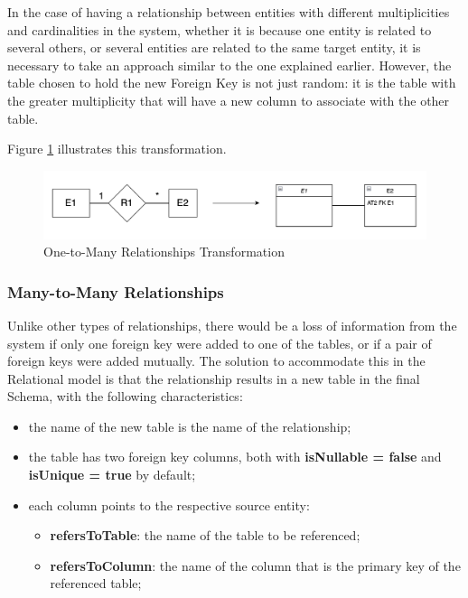 \documentclass[10pt]{article}
\begin{document}
In the case of having a relationship between entities with different multiplicities and cardinalities in the system, whether it is because one entity is related to several others, or several entities are related to the same target entity, it is necessary to take an approach similar to the one explained earlier. However, the table chosen to hold the new Foreign Key is not just random: it is the table with the greater multiplicity that will have a new column to associate with the other table.

Figure \ref{figure7} illustrates this transformation.

\begin{center}
    \begin{figure}[H]
        \centering
        \includegraphics[width=1.0\textwidth]{imgs/one-to-many-transformation.png}
            \caption{One-to-Many Relationships Transformation}
        \label{figure7}
    \end{figure}
\end{center}

\subsubsection{Many-to-Many Relationships}

Unlike other types of relationships, there would be a loss of information from the system if only one foreign key were added to one of the tables, or if a pair of foreign keys were added mutually. The solution to accommodate this in the Relational model is that the relationship results in a new table in the final Schema, with the following characteristics:

\begin{itemize}

    \item the name of the new table is the name of the relationship;
    
    \item the table has two foreign key columns, both with \textbf{isNullable = false} and \textbf{isUnique = true} by default;
    
    \item each column points to the respective source entity:
    
        \begin{itemize}
    
            \item \textbf{refersToTable}: the name of the table to be referenced;
            
            \item \textbf{refersToColumn}: the name of the column that is the primary key of the referenced table;
    
        \end{itemize}
    
\end{itemize}
\end{document}
